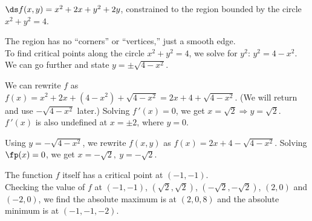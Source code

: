 {$\ds f(x,y) = x^2+2x+y^2+2y$, constrained to the region bounded by the circle $x^2+y^2=4$.
}
{The region has no ``corners'' or ``vertices,'' just a smooth edge.\\
To find critical points along the circle $x^2+y^2=4$, we solve for $y^2$: $y^2=4-x^2$. We can go further and state $y=\pm\sqrt{4-x^2}$. 

We can rewrite $f$ as $f(x)=x^2+2x + (4-x^2) + \sqrt{4-x^2} = 2x+4+\sqrt{4-x^2}$. (We will return and use $-\sqrt{4-x^2}$ later.) Solving $f\,'(x)=0$, we get $x=\sqrt{2} \Rightarrow y=\sqrt{2}$. $f\,'(x)$ is also undefined at $x=\pm 2$, where $y=0$. 

Using $y=-\sqrt{4-x^2}$, we rewrite $f(x,y)$ as $f(x) = 2x+4-\sqrt{4-x^2}$. Solving $\fp(x) =0$, we get $x=-\sqrt{2},\ y=-\sqrt{2}$. 

The function $f$ itself has a critical point at $(-1,-1)$. \\
Checking the value of $f$ at $(-1,-1)$, $(\sqrt{2},\sqrt{2})$, $(-\sqrt{2},-\sqrt{2})$, $(2,0)$ and $(-2,0)$, we find the absolute maximum is at $(2,0,8)$ and the absolute minimum is at $(-1,-1,-2)$.
}